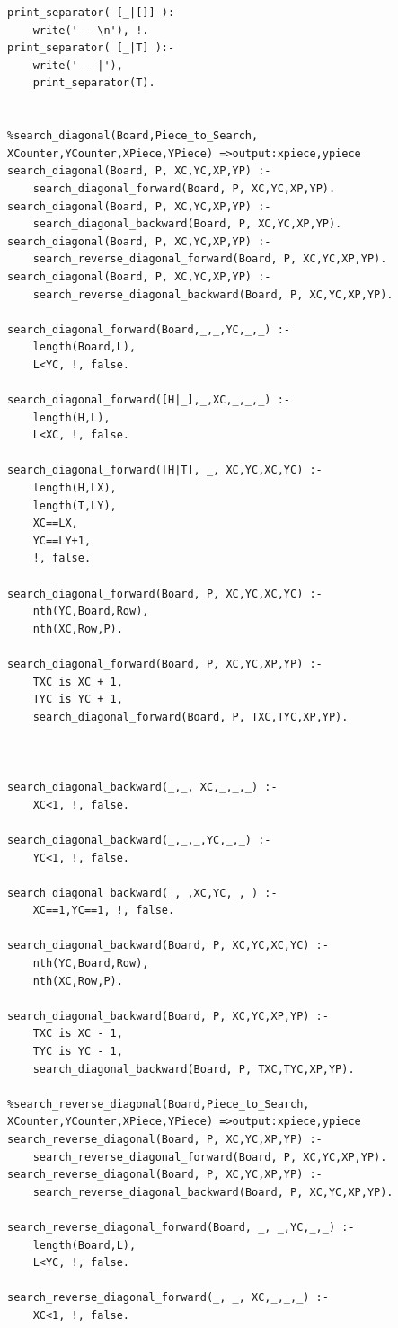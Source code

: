 \documentclass[15pt,a4paper]{article}
\begin{document}
\begin{verbatim}
print_separator( [_|[]] ):- 
	write('---\n'), !.
print_separator( [_|T] ):- 
	write('---|'), 
	print_separator(T).


%search_diagonal(Board,Piece_to_Search, XCounter,YCounter,XPiece,YPiece) =>output:xpiece,ypiece
search_diagonal(Board, P, XC,YC,XP,YP) :- 
	search_diagonal_forward(Board, P, XC,YC,XP,YP).
search_diagonal(Board, P, XC,YC,XP,YP) :- 
	search_diagonal_backward(Board, P, XC,YC,XP,YP).
search_diagonal(Board, P, XC,YC,XP,YP) :- 
	search_reverse_diagonal_forward(Board, P, XC,YC,XP,YP).
search_diagonal(Board, P, XC,YC,XP,YP) :- 
	search_reverse_diagonal_backward(Board, P, XC,YC,XP,YP).

search_diagonal_forward(Board,_,_,YC,_,_) :- 
	length(Board,L), 
	L<YC, !, false.

search_diagonal_forward([H|_],_,XC,_,_,_) :- 
	length(H,L), 
	L<XC, !, false.

search_diagonal_forward([H|T], _, XC,YC,XC,YC) :- 
	length(H,LX), 
	length(T,LY),
	XC==LX,
	YC==LY+1,
	!, false.

search_diagonal_forward(Board, P, XC,YC,XC,YC) :- 
	nth(YC,Board,Row),
	nth(XC,Row,P).
					
search_diagonal_forward(Board, P, XC,YC,XP,YP) :- 
	TXC is XC + 1,
	TYC is YC + 1,
	search_diagonal_forward(Board, P, TXC,TYC,XP,YP).



search_diagonal_backward(_,_, XC,_,_,_) :- 
	XC<1, !, false.
 
search_diagonal_backward(_,_,_,YC,_,_) :- 
	YC<1, !, false.

search_diagonal_backward(_,_,XC,YC,_,_) :- 
	XC==1,YC==1, !, false.

search_diagonal_backward(Board, P, XC,YC,XC,YC) :- 
	nth(YC,Board,Row),
	nth(XC,Row,P).
						
search_diagonal_backward(Board, P, XC,YC,XP,YP) :- 
	TXC is XC - 1,
	TYC is YC - 1, 
	search_diagonal_backward(Board, P, TXC,TYC,XP,YP).
						
%search_reverse_diagonal(Board,Piece_to_Search, XCounter,YCounter,XPiece,YPiece) =>output:xpiece,ypiece
search_reverse_diagonal(Board, P, XC,YC,XP,YP) :- 
	search_reverse_diagonal_forward(Board, P, XC,YC,XP,YP).
search_reverse_diagonal(Board, P, XC,YC,XP,YP) :- 
	search_reverse_diagonal_backward(Board, P, XC,YC,XP,YP).

search_reverse_diagonal_forward(Board, _, _,YC,_,_) :- 
	length(Board,L), 
	L<YC, !, false.

search_reverse_diagonal_forward(_, _, XC,_,_,_) :- 
	XC<1, !, false.


\end{verbatim}
\end{document}
